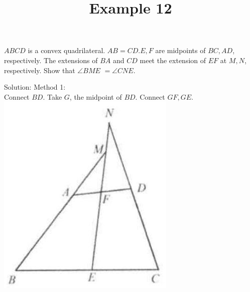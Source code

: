\documentclass{article}
\title{Example 12}
\date{}
\begin{document}
\maketitle

\(A B C D\) is a convex quadrilateral. \(A B=C D . E, F\) are midpoints of \(B C, A D\), respectively. The extensions of \(B A\) and \(C D\) meet the extension of \(E F\) at \(M, N\), respectively. Show that \(\angle B M E\) \(=\angle C N E\).

Solution:
Method 1:\\
Connect \(B D\). Take \(G\), the midpoint of \(B D\). Connect \(G F, G E\).\\
\centering
\includegraphics[width=\textwidth]{images/042(2).jpg}
\end{document}
